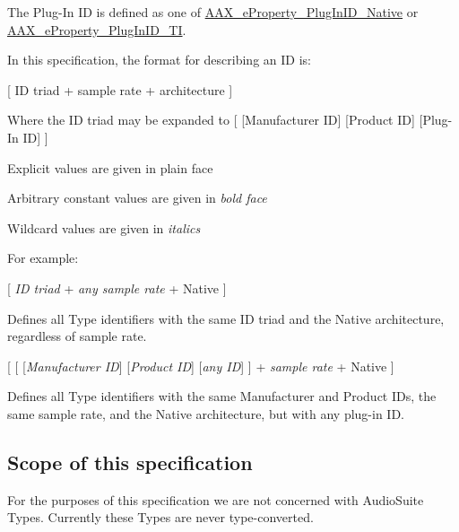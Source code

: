 The Plug-\/\+In I\+D is defined as one of \hyperlink{a00283_a6571f4e41a5dd06e4067249228e2249ea89ca3dd6e96895cda14976c1b1ceb826}{A\+A\+X\+\_\+e\+Property\+\_\+\+Plug\+In\+I\+D\+\_\+\+Native} or \hyperlink{a00283_a6571f4e41a5dd06e4067249228e2249ea75f174df4efbeca86eaada126c1d9214}{A\+A\+X\+\_\+e\+Property\+\_\+\+Plug\+In\+I\+D\+\_\+\+T\+I}.

In this specification, the format for describing an I\+D is\+:

\mbox{[} I\+D triad + sample rate + architecture \mbox{]}

Where the I\+D triad may be expanded to \mbox{[} \mbox{[}Manufacturer I\+D\mbox{]} \mbox{[}Product I\+D\mbox{]} \mbox{[}Plug-\/\+In I\+D\mbox{]} \mbox{]}


\begin{DoxyItemize}
\item Explicit values are given in plain face  
\item Arbitrary constant values are given in {\itshape bold face}  
\item Wildcard values are given in {\itshape italics}  
\end{DoxyItemize}

For example\+: 
\begin{DoxyItemize}
\item \mbox{[} {\itshape I\+D triad} + {\itshape any sample rate} + Native \mbox{]} 
\begin{DoxyItemize}
\item Defines all Type identifiers with the same I\+D triad and the Native architecture, regardless of sample rate.  
\end{DoxyItemize}
\item \mbox{[} \mbox{[} \mbox{[}{\itshape Manufacturer I\+D}\mbox{]} \mbox{[}{\itshape Product I\+D}\mbox{]} \mbox{[}{\itshape any I\+D}\mbox{]} \mbox{]} + {\itshape sample rate} + Native \mbox{]} 
\begin{DoxyItemize}
\item Defines all Type identifiers with the same Manufacturer and Product I\+Ds, the same sample rate, and the Native architecture, but with any plug-\/in I\+D.  
\end{DoxyItemize}
\end{DoxyItemize}\hypertarget{a00356_advancedTopics_relatedTypes_scope}{}\subsection{Scope of this specification}\label{a00356_advancedTopics_relatedTypes_scope}
For the purposes of this specification we are not concerned with Audio\+Suite Types. Currently these Types are never type-\/converted.

